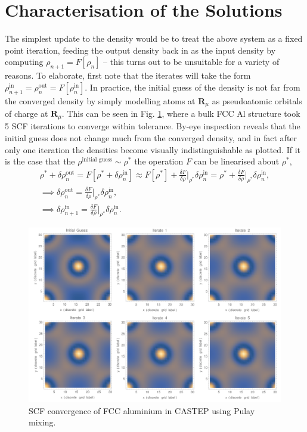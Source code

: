 \section{Characterisation of the Solutions}


The simplest update to the density would be to treat the above system as a fixed point iteration, feeding the output density back in as the input density by computing $\rho_{n+1}=F[\rho_{n}]$ -- this turns out to be unsuitable for a variety of reasons. To elaborate, first note that the iterates will take the form $\rho^{\text{in}}_{n+1} = \rho^{\text{out}}_{n} = F[\rho^{\text{in}}_{n}]$. In practice, the initial guess of the density is not far from the converged density by simply modelling atoms at $\textbf{R}_{\mu}$ as pseudoatomic orbitals of charge at $\textbf{R}_{\mu}$. This can be seen in Fig$.$ \ref{convergence}, where a bulk FCC Al structure took 5 SCF iterations to converge within tolerance. By-eye inspection reveals that the initial guess does not change much from the converged density, and in fact after only one iteration the densities become visually indistinguishable as plotted. If it is the case that the $\rho^{\text{initial guess}} \sim \rho^*$ the operation $F$ can be linearised about $\rho^*$,
\begin{gather}
\rho^* + \delta \rho^{\text{out}}_n = F[\rho^* + \delta \rho^{\text{in}}_{n}] \approx F[\rho^*] + \frac{\delta F}{\delta \rho}\bigg\rvert_{\rho^*} \delta \rho^{\text{in}}_{n} = \rho^* + \frac{\delta F}{\delta \rho}\bigg\rvert_{\rho^*}  \delta \rho^{\text{in}}_{n}, \\ \label{linearresponse}
\implies \delta \rho^{\text{out}}_n = \frac{\delta F}{\delta \rho}\bigg\rvert_{\rho^*}  \delta \rho^{\text{in}}_{n}, \\
\implies \delta \rho^{\text{in}}_{n+1} = \frac{\delta F}{\delta \rho}\bigg\rvert_{\rho^*}  \delta \rho^{\text{in}}_{n}.
\end{gather}
\begin{figure}
{\hspace{-1em}}\includegraphics[width=6in]{Al_convergence.pdf}
\caption{SCF convergence of FCC aluminium in CASTEP using Pulay mixing.}
\label{convergence}
\end{figure}
